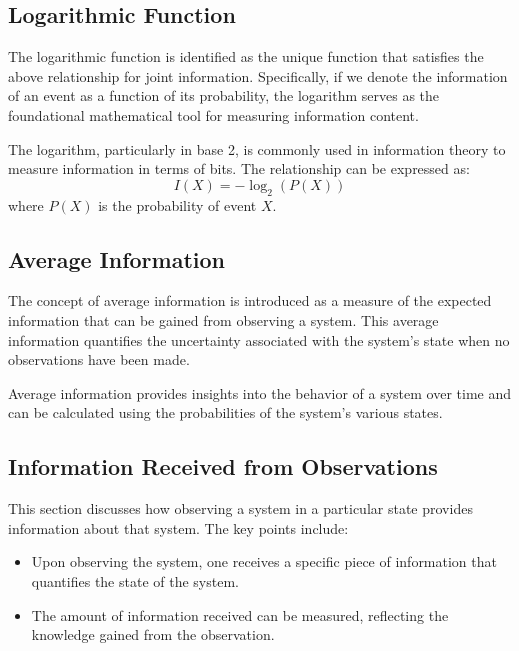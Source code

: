\documentclass[12pt,a4paper]{article}
\newenvironment{defbox}[1][]{%
  \begin{tcolorbox}[enhanced, breakable, colback=defcolor, colframe=green!50!black, title=#1, fonttitle=\bfseries, arc=3pt, boxrule=0.5pt]
}{\end{tcolorbox}}
\newenvironment{rembox}[1][]{%
  \begin{tcolorbox}[enhanced, breakable, colback=gray!5, colframe=gray!50, title=#1, fonttitle=\bfseries, arc=3pt, boxrule=0.5pt]
}{\end{tcolorbox}}
\begin{document}
\subsection{Logarithmic Function}
The logarithmic function is identified as the unique function that satisfies the above relationship for joint information. Specifically, if we denote the information of an event as a function of its probability, the logarithm serves as the foundational mathematical tool for measuring information content.

\begin{defbox}[Logarithmic Function]
The logarithm, particularly in base 2, is commonly used in information theory to measure information in terms of bits. The relationship can be expressed as:
\[
I(X) = -\log_2(P(X))
\]
where \( P(X) \) is the probability of event \( X \).
\end{defbox}

\subsection{Average Information}
The concept of average information is introduced as a measure of the expected information that can be gained from observing a system. This average information quantifies the uncertainty associated with the system's state when no observations have been made.

\begin{rembox}[Average Information]
Average information provides insights into the behavior of a system over time and can be calculated using the probabilities of the system's various states.
\end{rembox}

\subsection{Information Received from Observations}
This section discusses how observing a system in a particular state provides information about that system. The key points include:

\begin{itemize}
    \item Upon observing the system, one receives a specific piece of information that quantifies the state of the system.
    \item The amount of information received can be measured, reflecting the knowledge gained from the observation.
\end{itemize}
\end{document}
